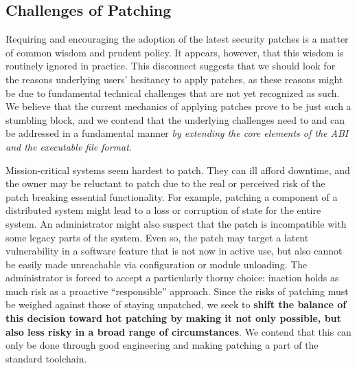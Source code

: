 \subsection{Challenges of Patching}
\label{ssec:challenges}

Requiring and encouraging the adoption of the latest security patches
is a matter of common wisdom and prudent policy.  It appears, however,
that this wisdom is routinely ignored in practice.  This disconnect
suggests that we should look for the reasons underlying users'
hesitancy to apply patches, as these reasons might be due to
fundamental technical challenges that are not yet recognized as such.
We believe that the current mechanics of applying patches prove to be
just such a stumbling block, and we contend that the underlying
challenges need to and can be addressed in a fundamental manner {\em
  by extending the core elements of the ABI and the executable file
  format}.


Mission-critical systems seem hardest to patch.  They can ill afford
downtime, and the owner may be reluctant to patch due to the real or
perceived risk of the patch breaking essential functionality.  For
example, patching a component of a distributed system might lead to a
loss or corruption of state for the entire system.  An administrator
might also suspect that the patch is incompatible with some legacy
parts of the system.  Even so, the patch may target a latent
vulnerability in a software feature that is not now in active use, but
also cannot be easily made unreachable via configuration or module
unloading.  The administrator is forced to accept a particularly
thorny choice: inaction holds as much risk as a proactive
``responsible'' approach.  Since the risks of patching must
be weighed against those of staying unpatched, we seek to
{\bf shift the balance of this decision toward hot patching by making
  it not only possible, but also less risky in a broad range of
  circumstances}. We contend that this can only be done through good
engineering and making patching a part of the standard toolchain.

